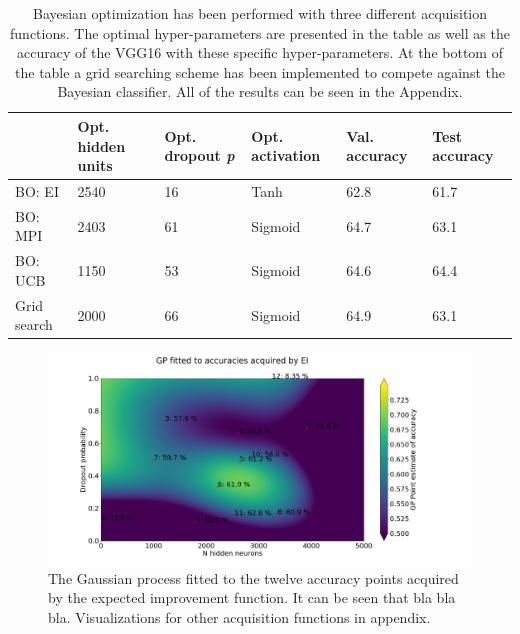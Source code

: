 \documentclass[12pt,fleqn]{article}
\begin{document}
\begin{table}[H]\label{resultater}
	\begin{tabular}{l|lllll}
		  & Opt. hidden units & Opt. dropout \textit{p} & Opt. activation & Val. accuracy &Test accuracy \\ \hline
		BO: EI  & 2540      & 16\pro              & Tanh             &    62.8\pro & 61.7\pro   \\ 
		BO: MPI & 2403         & 61\pro             & Sigmoid             & 64.7\pro  & 63.1\pro     \\ 
		BO: UCB & 1150         & 53\pro              & Sigmoid             & 64.6\pro  & 64.4\pro     \\ 
		Grid search & 2000         & 66\pro              & Sigmoid             & 64.9\pro & 63.1\pro          \\
	\end{tabular}
\caption{Bayesian optimization has been performed with three different acquisition functions. The optimal hyper-parameters are presented in the table as well as the accuracy of the VGG16 with these specific hyper-parameters. At the bottom of the table a grid searching scheme has been implemented to compete against the Bayesian classifier. All of the results can be seen in the Appendix. }
\end{table}
\begin{figure}[H]
	\centering

	\includegraphics[width=\textwidth]{EIGP}	

\caption{The Gaussian process fitted to the twelve accuracy points acquired by the expected improvement function. It can be seen that bla bla bla. Visualizations for other acquisition functions in appendix.}
\end{figure}
\end{document}
